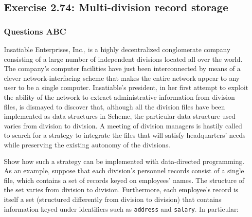 \documentclass[final,fleqn,titlepage,twoside]{article}
\begin{document}
\subsection{Exercise 2.74: Multi-division record storage}
\label{sec:org053aef8}
\subsubsection{Questions ABC}
\label{sec:orgf534ae2}
Insatiable Enterprises, Inc., is a highly decentralized conglomerate company
consisting of a large number of independent divisions located all over the
world. The company's computer facilities have just been interconnected by means
of a clever network-interfacing scheme that makes the entire network appear to
any user to be a single computer. Insatiable's president, in her first attempt
to exploit the ability of the network to extract administrative information from
division files, is dismayed to discover that, although all the division files
have been implemented as data structures in Scheme, the particular data
structure used varies from division to division. A meeting of division managers
is hastily called to search for a strategy to integrate the files that will
satisfy headquarters' needs while preserving the existing autonomy of the
divisions.

Show how such a strategy can be implemented with data-directed programming. As
an example, suppose that each division's personnel records consist of a single
file, which contains a set of records keyed on employees' names. The structure
of the set varies from division to division. Furthermore, each employee's record
is itself a set (structured differently from division to division) that contains
information keyed under identifiers such as \texttt{address} and
\texttt{salary}. In particular:
\end{document}
